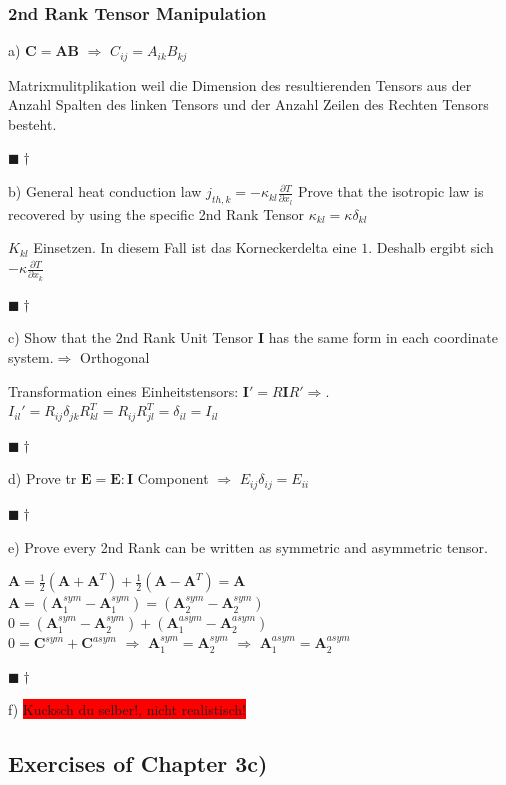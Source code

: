 \documentclass[a4paper]{scrartcl}
\newcommand{\qed}{\begin{flushright}
$\blacksquare \dagger$ \end{flushright}}
\begin{document}
\subsubsection{2nd Rank Tensor Manipulation}

a) $\mathbf{C}=\mathbf{AB}$ $\Rightarrow$ $C_{ij}=A_{ik}B_{kj}$

Matrixmulitplikation weil die Dimension des resultierenden Tensors aus der
Anzahl Spalten des linken Tensors und der Anzahl Zeilen des Rechten Tensors
besteht. \qed

b) General heat conduction law $j_{th,k}=-\kappa_{kl}\frac{\partial
T}{\partial x_l}$ Prove that the isotropic law is recovered by using the
specific 2nd Rank Tensor $\kappa_{kl}=\kappa \delta_{kl}$

$K_{kl}$ Einsetzen. In diesem Fall ist das Korneckerdelta eine $1$. Deshalb
ergibt sich $-\kappa \frac{\partial T}{\partial x_k}$ \qed

c) Show that the 2nd Rank Unit Tensor $\mathbf{I}$ has the same form in each
coordinate system.$\Rightarrow$ Orthogonal

Transformation eines Einheitstensors: $\mathbf{I}'=R\mathbf{I}R'\Rightarrow$.
$I_{il}'=R_{ij}\delta_{jk}R_{kl}^T = R_{ij}R_{jl}^T=\delta_{il}=I_{il}$ \qed



d) Prove tr $\mathbf{E}=\mathbf{E : I}$
Component $\Rightarrow$ $E_{ij}\delta_{ij}=E_{ii}$ \qed

e) Prove every 2nd Rank can be written as symmetric and asymmetric tensor.

$\mathbf{A}=\frac{1}{2}\left(\mathbf{A} + \mathbf{A}^T\right)+
\frac{1}{2}\left(\mathbf{A}-\mathbf{A}^T\right) = \mathbf{A}$ \\
$\mathbf{A}=\left(\mathbf{A}_1^{sym}-\mathbf{A}_1^{sym}\right)=\left(\mathbf{A}_2^{sym}-\mathbf{A}_2^{sym}\right)$
\\
$0=\left(\mathbf{A}_1^{sym}-\mathbf{A}_2^{sym}\right)+\left(\mathbf{A}_1^{asym}-\mathbf{A}_2^{asym}\right)$
\\
$0=\mathbf{C}^{sym}+\mathbf{C}^{asym}$ $\Rightarrow$
$\mathbf{A}_1^{sym}=\mathbf{A}_2^{sym}$ $\Rightarrow$
$\mathbf{A}_1^{asym}=\mathbf{A}_2^{asym}$ \qed


f) \colorbox{red}{Kucksch du selber!, nicht realistisch!}




\subsection{Exercises of Chapter 3c)}
\end{document}
